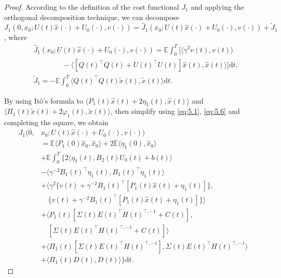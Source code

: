 \documentclass[10pt,a4paper]{amsart}
\begin{document}
\begin{proof}
	According to the definition of the cost functional $J_1$ and applying the orthogonal decomposition technique, we can decompose $J_1(0,x_0;U(t)\widehat{x}(\cdot) + U_0(\cdot),v(\cdot)) = \widehat{J}_1(x_0;U(t)\widehat{x}(\cdot) + U_0(\cdot),v(\cdot)) + \widetilde{J}_1$, where
	\begin{equation*}
		\begin{aligned}
			&\widehat{J}_1(x_0;U(t)\widehat{x}(\cdot) + U_0(\cdot),v(\cdot)) = \mathbb{E}\int_0^T \Big[\langle\gamma^2v(t),v(t)\rangle \\
			&\qquad \qquad- \langle[Q(t)^{\top}Q(t) + U(t)^{\top}U(t)]\widehat{x}(t),\widehat{x}(t)\rangle\Big]\mathrm{d}t,\\
			&\widetilde{J}_1 = -\mathbb{E}\int_0^T \langle Q(t)^{\top}Q(t)\widetilde{x}(t),\widetilde{x}(t)\rangle \mathrm{d}t.
		\end{aligned}
	\end{equation*}
	
	By using It\^{o}'s formula to $\langle P_1(t)\widehat{x}(t) + 2\eta_1(t),\widehat{x}(t)\rangle$ and $\langle \Pi_1(t)\widetilde{x}(t) + 2\varphi_1(t),\widetilde{x}(t)\rangle$, then simplify using \eqref{eq:5.1}, \eqref{eq:5.6} and completing the square, we obtain
	\begin{equation}\label{eq:5.15}
		\begin{aligned}
			J_1(0,&x_0;U(t)\widehat{x}(\cdot) + U_0(\cdot),v(\cdot)) \\
			&= \mathbb{E} \langle P_1(0)\widehat{x}_0,\widehat{x}_0 \rangle + 2\mathbb{E} \langle \eta_1(0),\widehat{x}_0 \rangle\\
			&+ \mathbb{E} \int_0^T \Big\{ 2\langle \eta_1(t), B_2(t)U_0(t) + b(t) \rangle \\
			& - \langle \gamma^{-2} B_1(t)^\top \eta_1(t),B_1(t)^\top \eta_1(t) \rangle\\
			& + \langle \gamma^2\{v(t) + \gamma^{-2}B_1(t)^{\top}[P_1(t)\widehat{x}(t) + \eta_1(t)]\},\\
			&\quad\{v(t) + \gamma^{-2}B_1(t)^{\top}[P_1(t)\widehat{x}(t) + \eta_1(t)]\} \rangle\\
			&+ \langle P_1(t)[\Sigma(t) E(t)^\top H(t)^{\top,-1} + C(t)],\\
			&\quad [\Sigma(t)E(t)^\top H(t)^{\top,-1} + C(t)] \rangle\\
			& + \langle \Pi_1(t)[\Sigma(t)E(t)^{\top}H(t)^{\top,-1}],\Sigma(t)E(t)^{\top}H(t)^{\top,-1} \rangle \\
			& + \langle \Pi_1(t)D(t),D(t) \rangle \Big\} \mathrm{d}t.
		\end{aligned}
	\end{equation}
	

\end{proof}
\end{document}
